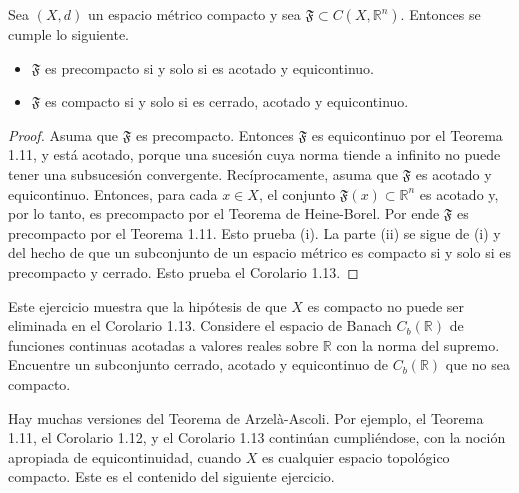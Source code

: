 \begin{corollary}\label{cor:1.13}
Sea $(X, d)$ un espacio métrico compacto y sea $\mathfrak{F}\subset C(X,\mathbb{R}^{n})$. Entonces se cumple lo siguiente.
\begin{itemize}
    \item[(i)] $\mathfrak{F}$ es precompacto si y solo si es acotado y equicontinuo.
    \item[(ii)] $\mathfrak{F}$ es compacto si y solo si es cerrado, acotado y equicontinuo.
\end{itemize}
\end{corollary}
\begin{proof}
Asuma que $\mathfrak{F}$ es precompacto. Entonces $\mathfrak{F}$ es equicontinuo por el Teorema 1.11, y está acotado, porque una sucesión cuya norma tiende a infinito no puede tener una subsucesión convergente. Recíprocamente, asuma que $\mathfrak{F}$ es acotado y equicontinuo. Entonces, para cada $x\in X$, el conjunto $\mathfrak{F}(x)\subset\mathbb{R}^{n}$ es acotado y, por lo tanto, es precompacto por el Teorema de Heine-Borel. Por ende $\mathfrak{F}$ es precompacto por el Teorema 1.11. Esto prueba (i). La parte (ii) se sigue de (i) y del hecho de que un subconjunto de un espacio métrico es compacto si y solo si es precompacto y cerrado. Esto prueba el Corolario 1.13.
\end{proof}

\begin{exercise}\label{ex:1.14}
Este ejercicio muestra que la hipótesis de que $X$ es compacto no puede ser eliminada en el Corolario 1.13. Considere el espacio de Banach $C_{b}(\mathbb{R})$ de funciones continuas acotadas a valores reales sobre $\mathbb{R}$ con la norma del supremo. Encuentre un subconjunto cerrado, acotado y equicontinuo de $C_{b}(\mathbb{R})$ que no sea compacto.
\end{exercise}

Hay muchas versiones del Teorema de Arzelà-Ascoli. Por ejemplo, el Teorema 1.11, el Corolario 1.12, y el Corolario 1.13 continúan cumpliéndose, con la noción apropiada de equicontinuidad, cuando $X$ es cualquier espacio topológico compacto. Este es el contenido del siguiente ejercicio.

